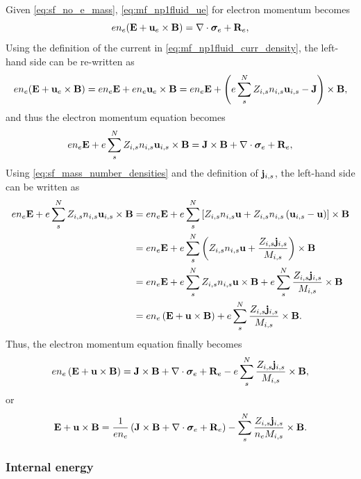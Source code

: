 \documentclass[a4paper,11pt]{report}
\begin{document}
Given \cref{eq:sf_no_e_mass}, \cref{eq:mf_np1fluid_ue} for electron momentum becomes
\begin{equation*}
    e n_e ( \mathbf{E} + \mathbf{u}_e \times \mathbf{B} ) = \nabla \cdot \bm \sigma_e + \mathbf{R}_e,
\end{equation*}
Using the definition of the current in \cref{eq:mf_np1fluid_curr_density}, the left-hand side can be re-written as
\begin{equation*}
    e n_e ( \mathbf{E} + \mathbf{u}_e \times \mathbf{B} ) = e n_e \mathbf{E} + e n_e \mathbf{u}_e \times \mathbf{B} = e n_e \mathbf{E} + \left( e \sum_s^N Z_{i,s} n_{i,s} \mathbf{u}_{i,s} - \mathbf{J} \right) \times \mathbf{B},
\end{equation*}
and thus the electron momentum equation becomes
\begin{equation*}
    e n_e \mathbf{E} + e \sum_s^N Z_{i,s} n_{i,s} \mathbf{u}_{i,s} \times \mathbf{B} = \mathbf{J} \times \mathbf{B} + \nabla \cdot \bm \sigma_e + \mathbf{R}_e,
\end{equation*}
Using \cref{eq:sf_mass_number_densities} and the definition of $\mathbf{j}_{i,s}$, the left-hand side can be written as
\begin{align*}
    e n_e \mathbf{E} + e \sum_s^N Z_{i,s} n_{i,s} \mathbf{u}_{i,s} \times \mathbf{B} &= e n_e \mathbf{E} + e \sum_s^N \left[ Z_{i,s} n_{i,s} \mathbf{u} + Z_{i,s} n_{i,s} \left( \mathbf{u}_{i,s} - \mathbf{u} \right) \right] \times \mathbf{B} \\
    &= e n_e \mathbf{E} + e \sum_s^N \left( Z_{i,s} n_{i,s} \mathbf{u} + \frac{Z_{i,s} \mathbf{j}_{i,s}}{M_{i,s}} \right) \times \mathbf{B} \\
    &= e n_e \mathbf{E} + e \sum_s^N Z_{i,s} n_{i,s} \mathbf{u} \times \mathbf{B} + e \sum_s^N \frac{Z_{i,s} \mathbf{j}_{i,s}}{M_{i,s}} \times \mathbf{B} \\
    &= e n_e \left( \mathbf{E} + \mathbf{u} \times \mathbf{B} \right) + e \sum_s^N \frac{Z_{i,s} \mathbf{j}_{i,s}}{M_{i,s}} \times \mathbf{B}.
\end{align*}
Thus, the electron momentum equation finally becomes
\begin{equation*}
    e n_e \left( \mathbf{E} + \mathbf{u} \times \mathbf{B} \right) = \mathbf{J} \times \mathbf{B} + \nabla \cdot \bm \sigma_e + \mathbf{R}_e - e \sum_s^N \frac{Z_{i,s} \mathbf{j}_{i,s}}{M_{i,s}} \times \mathbf{B},
\end{equation*}
or
\begin{equation}
    \mathbf{E} + \mathbf{u} \times \mathbf{B} = \frac{1}{e n_e} \left( \mathbf{J} \times \mathbf{B} + \nabla \cdot \bm \sigma_e + \mathbf{R}_e \right) - \sum_s^N \frac{Z_{i,s} \mathbf{j}_{i,s}}{n_e M_{i,s}} \times \mathbf{B}.
\end{equation}

\subsubsection{Internal energy}
\end{document}
